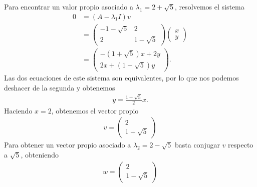 \documentclass{article}
\theoremstyle{definition}
\begin{document}
\begin{enumerate}
	Para encontrar un valor propio asociado a $\lambda_1 = 2+\sqrt{5}$, resolvemos el sistema
		\begin{align}
			0 & = (A-\lambda_1 I) v \\
			& = \begin{pmatrix}
				-1 - \sqrt{5} & 2 \\
				2 & 1-\sqrt{5}
			\end{pmatrix} \begin{pmatrix}
			x \\ y
			\end{pmatrix} \\
			& = \begin{pmatrix}
				-(1+\sqrt{5}) x +2y \\
				2x +(1-\sqrt{5})y
			\end{pmatrix}.
		\end{align}
	Las dos ecuaciones de este sistema son equivalentes, por lo que nos podemos deshacer de la segunda y obtenemos
		\begin{align}
			y = \frac{1+\sqrt{5}}{2} x.
		\end{align}
	Haciendo $x=2$, obtenemos el vector propio
		\begin{align}
			v = \begin{pmatrix}
				2 \\ 1+\sqrt{5}
			\end{pmatrix}
		\end{align}
	Para obtener un vector propio asociado a $\lambda_2 = 2-\sqrt{5}$ basta conjugar $v$ respecto a $\sqrt{5}$, obteniendo 
		\begin{align}
			w = \begin{pmatrix}
			2 \\
			1-\sqrt{5}
			\end{pmatrix}
		\end{align}
		

\end{enumerate}
\end{document}
